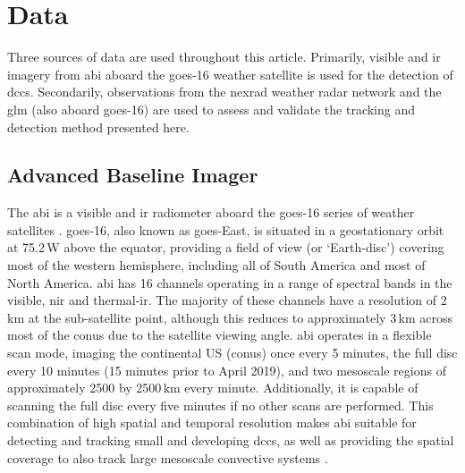 

\section{Data}

Three sources of data are used throughout this article.
Primarily, visible and \acrshort{ir} imagery from \acrshort{abi} aboard the \acrshort{goes}-16 weather satellite is used for the detection of \acrshort{dcc}s.
Secondarily, observations from the \acrshort{nexrad} weather radar network and the \acrshort{glm} (also aboard \acrshort{goes}-16) are used to assess and validate the tracking and detection method presented here.


\subsection{Advanced Baseline Imager}


The \acrshort{abi} is a visible and \acrshort{ir} radiometer aboard the \acrshort{goes}-16 series of weather satellites \citep{schmit_closer_2016}.
\acrshort{goes}-16, also known as \acrshort{goes}-East, is situated in a geostationary orbit at 75.2\,\textdegree W above the equator, providing a field of view (or `Earth-disc') covering most of the western hemisphere, including all of South America and most of North America.
\acrshort{abi} has 16 channels operating in a range of spectral bands in the visible, \acrshort{nir} and thermal-\acrshort{ir}.
The majority of these channels have a resolution of 2\,\unit{km} at the sub-satellite point, although this reduces to approximately 3\,\unit{km} across most of the \acrshort{conus} due to the satellite viewing angle.
\acrshort{abi} operates in a flexible scan mode, imaging the continental US (\acrshort{conus}) once every 5 minutes, the full disc every 10 minutes (15 minutes prior to April 2019), and two mesoscale regions of approximately 2500 by 2500\,\unit{km} every minute.
Additionally, it is capable of scanning the full disc every five minutes if no other scans are performed.
This combination of high spatial and temporal resolution makes \acrshort{abi} suitable for detecting and tracking small and developing \acrshort{dcc}s, as well as providing the spatial coverage to also track large mesoscale convective systems \citep{heikenfeld_tobac_2019}.

